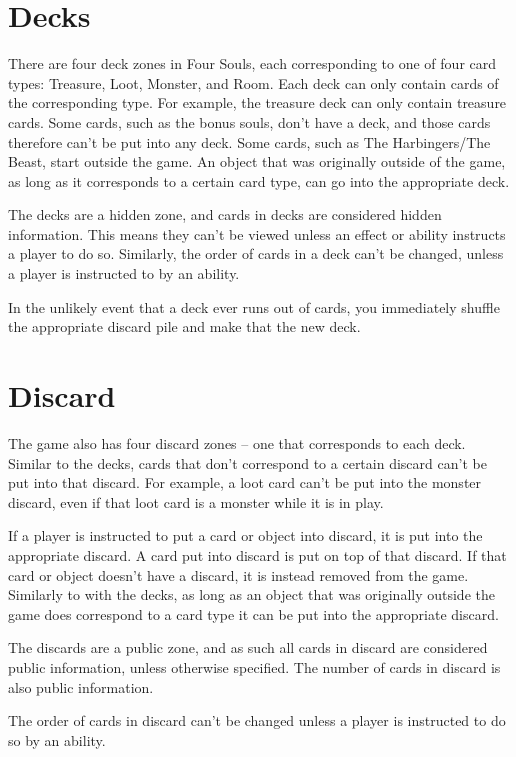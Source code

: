 \documentclass[a4paper, twoside]{report} %
\begin{document}
    \section{Decks}
    There are four deck zones in Four Souls, each corresponding to one of four card types: Treasure, Loot, Monster, and Room. Each deck can only contain cards of the corresponding type. For example, the treasure deck can only contain treasure cards. Some cards, such as the bonus souls, don’t have a deck, and those cards therefore can’t be put into any deck. Some cards, such as The Harbingers/The Beast, start outside the game. An object that was originally outside of the game, as long as it corresponds to a certain card type, can go into the appropriate deck.

    The decks are a hidden zone, and cards in decks are considered hidden information. This means they can’t be viewed unless an effect or ability instructs a player to do so. Similarly, the order of cards in a deck can’t be changed, unless a player is instructed to by an ability.

    In the unlikely event that a deck ever runs out of cards, you immediately shuffle the appropriate discard pile and make that the new deck.

    \section{Discard}
    The game also has four discard zones – one that corresponds to each deck. Similar to the decks, cards that don’t correspond to a certain discard can’t be put into that discard. For example, a loot card can’t be put into the monster discard, even if that loot card is a monster while it is in play.

    If a player is instructed to put a card or object into discard, it is put into the appropriate discard. A card put into discard is put on top of that discard. If that card or object doesn’t have a discard, it is instead removed from the game. Similarly to with the decks, as long as an object that was originally outside the game does correspond to a card type it can be put into the appropriate discard.

    The discards are a public zone, and as such all cards in discard are considered public information, unless otherwise specified. The number of cards in discard is also public information.

    The order of cards in discard can’t be changed unless a player is instructed to do so by an ability.
\end{document}
